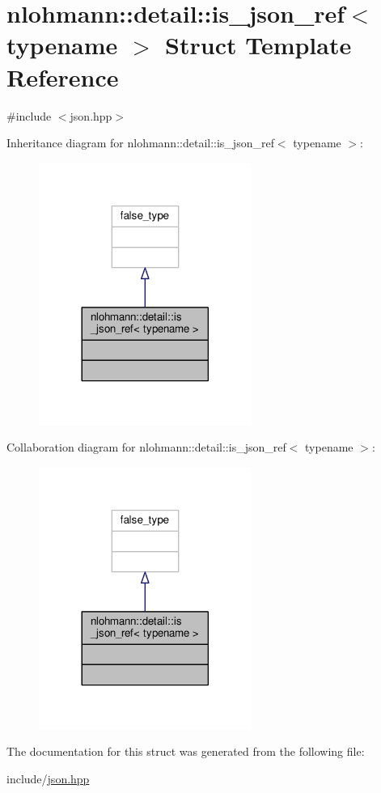 \hypertarget{structnlohmann_1_1detail_1_1is__json__ref}{}\section{nlohmann\+:\+:detail\+:\+:is\+\_\+json\+\_\+ref$<$ typename $>$ Struct Template Reference}
\label{structnlohmann_1_1detail_1_1is__json__ref}


{\ttfamily \#include $<$json.\+hpp$>$}



Inheritance diagram for nlohmann\+:\+:detail\+:\+:is\+\_\+json\+\_\+ref$<$ typename $>$\+:
\nopagebreak
\begin{figure}[H]
\begin{center}
\leavevmode
\includegraphics[width=197pt]{structnlohmann_1_1detail_1_1is__json__ref__inherit__graph}
\end{center}
\end{figure}


Collaboration diagram for nlohmann\+:\+:detail\+:\+:is\+\_\+json\+\_\+ref$<$ typename $>$\+:
\nopagebreak
\begin{figure}[H]
\begin{center}
\leavevmode
\includegraphics[width=197pt]{structnlohmann_1_1detail_1_1is__json__ref__coll__graph}
\end{center}
\end{figure}


The documentation for this struct was generated from the following file\+:\begin{DoxyCompactItemize}
\item 
include/\hyperlink{json_8hpp}{json.\+hpp}\end{DoxyCompactItemize}
